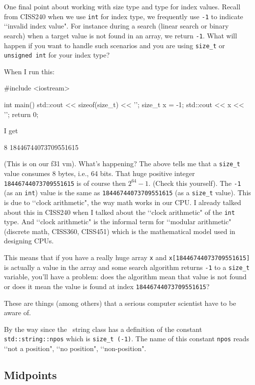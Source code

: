 One final point about working with size type and type for index values.
Recall from CISS240 when we use \verb!int! for index type,
we frequently use \verb!-1! to indicate \lq\lq invalid index value".
For instance during a search (linear search or binary search) when a
target value is not found in an array, we return \verb!-1!.
What will happen if you want to handle such scenarios and you are
using \verb!size_t! or \verb!unsigned int! for your index type?

When I run this:
\begin{console}
#include <iostream>

int main()
{
    std::cout << sizeof(size_t) << '\n';
    size_t x = -1;
    std::cout << x << '\n';
    return 0;
}
\end{console}
I get
\begin{console}
8
18446744073709551615
\end{console}
(This is on our f31 vm).
What's happening?
The above tells me that a \verb!size_t! value consumes 8 bytes, i.e., 64 bits.
That huge positive integer \verb!18446744073709551615! is of course
then $2^{64} - 1$. (Check this yourself).
The \verb!-1! (as an \verb!int!) value is the same as
\verb!18446744073709551615! (as a \verb!size_t! value).
This is due to \lq\lq clock arithmetic", the way math
works in our CPU.
I already talked about this in CISS240 when I talked about
the \lq\lq clock arithmetic" of the \verb!int! type.
And \lq\lq clock arithmetic" is the informal term for
\lq\lq modular arithmetic"
(discrete math, CISS360, CISS451) which is the mathematical model used in
designing CPUs.

This means that if you have a really huge array \verb!x!
and \verb!x[18446744073709551615]! is actually a value in the array
and some search algorithm returns \verb!-1!
to a \verb!size_t! variable, you'll have a problem:
does the algorithm mean that value is not found
or does it mean the value is found at index \verb!18446744073709551615!?

These are things (among others) that a serious computer scientist
have to be aware of.

By the way since the \cpp\ string class has a definition
of the constant \verb!std::string::npos! which is \verb!size_t (-1)!.
The name of this constant \verb!npos! reads
\lq\lq not a position", \lq\lq no position", \lq\lq non-position".

\subsection{Midpoints}


